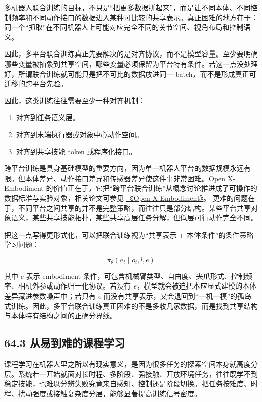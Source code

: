 多机器人联合训练的目标，不只是“把更多数据拼起来”，而是让不同本体、不同控制频率和不同动作接口的数据进入某种可比较的共享表示。真正困难的地方在于：同一个“抓取”在不同机器人上可能对应完全不同的关节空间、视角布局和控制语义。

因此，多平台联合训练真正先要解决的是对齐协议，而不是模型容量。至少要明确哪些变量被抽象到共享空间，哪些变量必须保留为平台特有条件。若这一点没处理好，所谓联合训练就可能只是把不可比的数据放进同一 batch，而不是形成真正可迁移的跨平台先验。

因此，这类训练往往需要至少一种对齐机制：

\begin{enumerate}
\item 对齐到任务语义层。
\item 对齐到末端执行器或对象中心动作空间。
\item 对齐到共享技能 token 或程序化接口。
\end{enumerate}

跨平台训练是具身基础模型的重要方向，因为单一机器人平台的数据规模永远有限。但本体差异、动作接口差异和传感器差异使这件事非常困难。Open X-Embodiment 的价值正在于，它把“跨平台联合训练”从概念讨论推进成了可操作的数据标准与实验对象，相关论文可参见 \href{https://arxiv.org/abs/2310.08864}{《Open X-Embodiment》}。 更难的问题在于，不同平台之间共享的并不是完整策略，而往往只是部分结构。某些平台共享对象语义，某些共享技能拓扑，某些共享高层任务分解，但低层可行动作完全不同。

把这一点写得更形式化，可以把联合训练视为“共享表示 + 本体条件”的条件策略学习问题：

\begin{equation*}
\pi_\theta(a_t \mid o_t, l, e)
\end{equation*}

其中 \(e\) 表示 embodiment 条件，可包含机械臂类型、自由度、夹爪形式、控制频率、相机外参或动作归一化协议。若没有 \(e\)，模型就会被迫把本应显式建模的本体差异藏进参数噪声中；若只有 \(e\) 而没有共享表示，又会退回到“一机一模”的孤岛式训练。因此，多平台联合训练真正困难的不是多收几家数据，而是找到共享结构与本体特有结构之间的正确分界线。

\subsection*{64.3 从易到难的课程学习}


课程学习在机器人里之所以有现实意义，是因为很多任务的探索空间本身就高度分层。系统若一开始就面对长时程、多阶段、强接触、开放环境任务，往往既学不到稳定技能，也难以分辨失败究竟来自感知、控制还是阶段切换。把任务按难度、时程、扰动强度或接触复杂度分层，能够显著提高训练信号密度。

